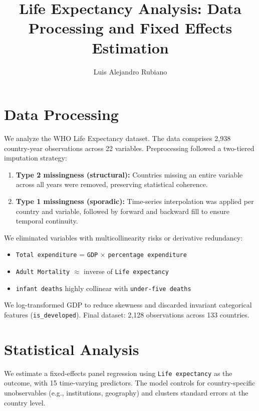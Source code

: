 \documentclass[11pt]{article}
\title{Life Expectancy Analysis: Data Processing and Fixed Effects Estimation}
\author{Luis Alejandro Rubiano}
\date{}
\begin{document}
\maketitle

\section*{Data Processing}

We analyze the WHO Life Expectancy dataset. The data comprises 2,938 country-year observations across 22 variables. Preprocessing followed a two-tiered imputation strategy:

\begin{enumerate}[label=\textbf{\arabic*.}]
    \item \textbf{Type 2 missingness (structural):} Countries missing an entire variable across all years were removed, preserving statistical coherence.
    \item \textbf{Type 1 missingness (sporadic):} Time-series interpolation was applied per country and variable, followed by forward and backward fill to ensure temporal continuity.
\end{enumerate}

We eliminated variables with multicollinearity risks or derivative redundancy:
\begin{itemize}
    \item \texttt{Total expenditure} = \texttt{GDP} × \texttt{percentage expenditure}
    \item \texttt{Adult Mortality} $\approx$ inverse of \texttt{Life expectancy}
    \item \texttt{infant deaths} highly collinear with \texttt{under-five deaths}
\end{itemize}

We log-transformed GDP to reduce skewness and discarded invariant categorical features (\texttt{is\_developed}). Final dataset: 2,128 observations across 133 countries.

\section*{Statistical Analysis}

We estimate a fixed-effects panel regression using \texttt{Life expectancy} as the outcome, with 15 time-varying predictors. The model controls for country-specific unobservables (e.g., institutions, geography) and clusters standard errors at the country level.
\end{document}
